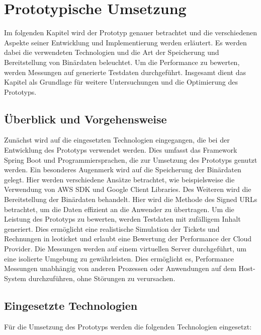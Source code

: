 \chapter{Prototypische Umsetzung}     

Im folgenden Kapitel wird der Prototyp genauer betrachtet und die verschiedenen Aspekte seiner Entwicklung und Implementierung werden erläutert. Es werden dabei die verwendeten Technologien und die Art der Speicherung und Bereitstellung von Binärdaten beleuchtet. Um die Performance zu bewerten, werden Messungen auf generierte Testdaten durchgeführt. Insgesamt dient das Kapitel als Grundlage für weitere Untersuchungen und die Optimierung des Prototyps.\\                               

\section{Überblick und Vorgehensweise}

Zunächst wird auf die eingesetzten Technologien eingegangen, die bei der Entwicklung des Prototyps verwendet werden. Dies umfasst das Framework Spring Boot und Programmiersprachen, die zur Umsetzung des Prototyps genutzt werden. Ein besonderes Augenmerk wird auf die Speicherung der Binärdaten gelegt. Hier werden verschiedene Ansätze betrachtet, wie beispielsweise die Verwendung von AWS SDK und Google Client Libraries. Des Weiteren wird die Bereitstellung der Binärdaten behandelt. Hier wird die Methode des Signed URLs betrachtet, um die Daten effizient an die Anwender zu übertragen. Um die Leistung des Prototyps zu bewerten, werden Testdaten mit zufälligem Inhalt generiert. Dies ermöglicht eine realistische Simulation der Tickets und Rechnungen in leoticket und erlaubt eine Bewertung der Performance der Cloud Provider. Die Messungen werden auf einem virtuellen Server durchgeführt, um eine isolierte Umgebung zu gewährleisten. Dies ermöglicht es, Performance Messungen unabhängig von anderen Prozessen oder Anwendungen auf dem Host-System durchzuführen, ohne Störungen zu verursachen.\\

\newpage

\section{Eingesetzte Technologien}

Für die Umsetzung des Prototyps werden die folgenden Technologien eingesetzt:

